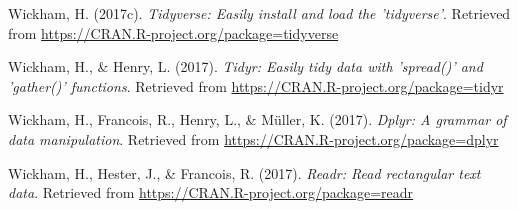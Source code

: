\documentclass[floatsintext,man]{apa6}
\theoremstyle{definition}
\theoremstyle{definition}
\theoremstyle{definition}
\theoremstyle{remark}
\begin{document}
\hypertarget{ref-R-tidyverse}{}
Wickham, H. (2017c). \emph{Tidyverse: Easily install and load the
'tidyverse'}. Retrieved from
\url{https://CRAN.R-project.org/package=tidyverse}

\hypertarget{ref-R-tidyr}{}
Wickham, H., \& Henry, L. (2017). \emph{Tidyr: Easily tidy data with
'spread()' and 'gather()' functions}. Retrieved from
\url{https://CRAN.R-project.org/package=tidyr}

\hypertarget{ref-R-dplyr}{}
Wickham, H., Francois, R., Henry, L., \& Müller, K. (2017). \emph{Dplyr:
A grammar of data manipulation}. Retrieved from
\url{https://CRAN.R-project.org/package=dplyr}

\hypertarget{ref-R-readr}{}
Wickham, H., Hester, J., \& Francois, R. (2017). \emph{Readr: Read
rectangular text data}. Retrieved from
\url{https://CRAN.R-project.org/package=readr}
\end{document}
